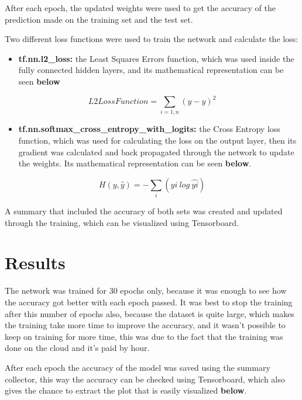 \documentclass{article}
\begin{document}
After each epoch, the updated weights were used to get the accuracy of the prediction made on the training set and the test set. 

Two different loss functions were used to train the network and calculate the loss:
\newpage
\begin{itemize}
\item \textbf{tf.nn.l2\_loss:} the Least Squares Errors function, which was used inside the fully connected hidden layers, and its mathematical representation can be seen \textbf{below}
\end{itemize}

\begin{equation} 
L2LossFunction =\sum_{i=1, n}(y-\hat{y})^{2}
\end{equation} 

\begin{itemize}
\item \textbf{tf.nn.softmax\_cross\_entropy\_with\_logits:} the Cross Entropy loss function, which was used for calculating the loss on the output layer, then its gradient was calculated and back propagated through the network to update the weights. Its mathematical representation can be seen \textbf{below}.
\end{itemize}

\begin{equation} 
H(y,\hat{y})=-\sum_{ i }(yi \ log \ \hat{yi})
\end{equation} 

A summary that included the accuracy of both sets was created and updated through the training, which can be visualized using Tensorboard.



\section{Results}

The network was trained for 30 epochs only, because it was enough to see how the accuracy got better with each epoch passed. It was best to stop the training after this number of epochs also, because the dataset is quite large, which makes the training take more time to improve the accuracy, and it wasn't possible to keep on training for more time, this was due to the fact that the training was done on the cloud and it's paid by hour.

After each epoch the accuracy of the model was saved using the summary collector, this way the accuracy can be checked using Tensorboard, which also gives the chance to extract the plot that is easily visualized \textbf{below}.
\end{document}
